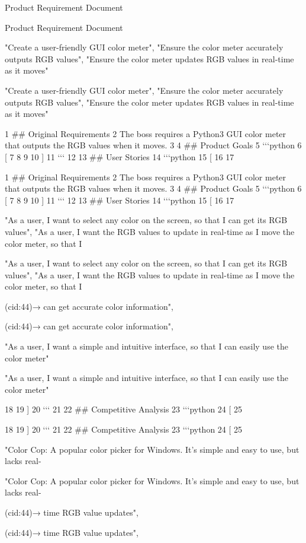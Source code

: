 \documentclass[12pt]{article}
\begin{document}
Product Requirement Document


Product Requirement Document


"Create a user-friendly GUI color meter",
"Ensure the color meter accurately outputs RGB values",
"Ensure the color meter updates RGB values in real-time as it moves"


"Create a user-friendly GUI color meter",
"Ensure the color meter accurately outputs RGB values",
"Ensure the color meter updates RGB values in real-time as it moves"


1 ## Original Requirements
2 The boss requires a Python3 GUI color meter that outputs the RGB values when it moves.
3
4 ## Product Goals
5 ‘‘‘python
6 [
7
8
9
10 ]
11 ‘‘‘
12
13 ## User Stories
14 ‘‘‘python
15 [
16
17


1 \#\# Original Requirements
2 The boss requires a Python3 GUI color meter that outputs the RGB values when it moves.
3
4 \#\# Product Goals
5 ‘‘‘python
6 [
7
8
9
10 ]
11 ‘‘‘
12
13 \#\# User Stories
14 ‘‘‘python
15 [
16
17


"As a user, I want to select any color on the screen, so that I can get its RGB values",
"As a user, I want the RGB values to update in real-time as I move the color meter, so that I


"As a user, I want to select any color on the screen, so that I can get its RGB values",
"As a user, I want the RGB values to update in real-time as I move the color meter, so that I


(cid:44)→ can get accurate color information",


(cid:44)→ can get accurate color information",


"As a user, I want a simple and intuitive interface, so that I can easily use the color meter"


"As a user, I want a simple and intuitive interface, so that I can easily use the color meter"


18
19 ]
20 ‘‘‘
21
22 ## Competitive Analysis
23 ‘‘‘python
24 [
25


18
19 ]
20 ‘‘‘
21
22 \#\# Competitive Analysis
23 ‘‘‘python
24 [
25


"Color Cop: A popular color picker for Windows. It’s simple and easy to use, but lacks real-


"Color Cop: A popular color picker for Windows. It’s simple and easy to use, but lacks real-


(cid:44)→ time RGB value updates",


(cid:44)→ time RGB value updates",
\end{document}

